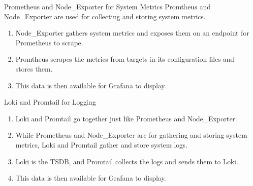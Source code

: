 \documentclass[14pt,compress,usenames,dvipsnames,aspectratio=169]{beamer}
\begin{document}
\begin{frame}{Prometheus and Node\_Exporter for System Metrics}
    Promtheus and Node\_Exporter are used for collecting and storing system metrics.
    \begin{enumerate}
        \item{Node\_Exporter gathers system metrics and exposes them on an endpoint
            for Prometheus to scrape.}
        \item{Promtheus scrapes the metrics from targets in its configuration files and stores them.}
        \item{This data is then available for Grafana to display.}
    \end{enumerate}
\end{frame}



\begin{frame}{Loki and Promtail for Logging}
    \begin{enumerate}
        \item{Loki and Promtail go together just like Prometheus and Node\_Exporter.  \\}
        \item{While Prometheus and Node\_Exporter are for gathering and storing system metrics,
            Loki and Promtail gather and store system logs.\\}
        \item{Loki is the TSDB, and Promtail collects the logs and sends them to Loki.\\}
        \item{This data is then available for Grafana to display.}
    \end{enumerate}
\end{frame}
\end{document}
